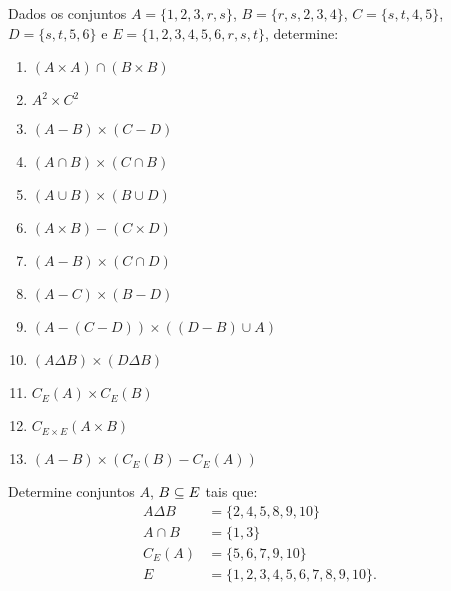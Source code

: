 \documentclass[12pt]{exam}
\begin{document}
    \questao{} Dados os conjuntos $A = \{1, 2, 3, r, s\}$, $B = \{r, s, 2, 3, 4\}$, $C = \{s, t, 4, 5\}$, $D = \{s, t, 5, 6\}$ e $E = \{1, 2, 3, 4, 5, 6, r, s, t\}$, determine:
    \begin{multicols}{2}
        \begin{enumerate}[label={\alph*})]
            \item $(A \times A) \cap (B \times B)$

            \item $A^2 \times C^2$

            \item $(A - B) \times (C - D)$

            \item $(A \cap B) \times (C \cap B)$

            \item $(A \cup B) \times (B \cup D)$

            \item $(A \times B) - (C \times D)$

            \item $(A - B) \times (C \cap D)$

            \item $(A - C) \times (B - D)$

            \item $(A - (C - D)) \times ((D - B) \cup A)$

            \item $(A \Delta B) \times (D \Delta B)$

            \item $C_E(A) \times C_E(B)$

            \item $C_{E\times E}(A \times B)$

            \item $(A - B) \times (C_E(B) - C_E(A))$
        \end{enumerate}

    \end{multicols}

    \vspace{.3cm}

    \questao{} Determine conjuntos $A$, $B \subseteq E$ tais que:
    \begin{align*}
        A \Delta B &= \{2, 4, 5, 8, 9, 10\}\\
        A \cap B &= \{1, 3\}\\
        C_E(A) &= \{5, 6, 7, 9, 10\}\\
        E &= \{1, 2, 3, 4, 5, 6, 7, 8, 9, 10\}.
    \end{align*}
\end{document}

